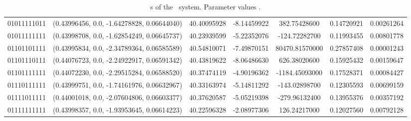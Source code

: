 \begin{table}
\begin{tabular}{c|c|c|c|c|c|c}
 	01011111011 & (0.43996456,   0.0, -1.64278828, 0.06644040) & 40.40095928 & -8.14459922 & 382.75428600 &0.14720921 &0.00261264 \\
 	01011111111 & (0.43998708,   0.0, -1.62854249, 0.06645737) & 40.23939599 & -5.22352076 & -124.72282700 &0.11993455 &0.00801778 \\
 	01101101111 & (0.43995834,   0.0, -2.34789364, 0.06585589) & 40.54810071 & -7.49870151 & 80470.81570000 &0.27857408 &0.00001243 \\
 	01101110111 & (0.44076723,   0.0, -2.24922917, 0.06591342) & 40.43819622 & -8.06486630 & 626.38020600 &0.15925432 &0.00159647 \\
 	01101111111 & (0.44072230,   0.0, -2.29515284, 0.06588520) & 40.37474119 & -4.90196362 & -1184.45093000 &0.17528371 &0.00084427 \\
 	01110111111 & (0.43999751,   0.0, -1.74161976, 0.06632967) & 40.33163974 & -5.14811292 & -143.02898700 &0.12305593 &0.00699159 \\
 	01111011111 & (0.44001018,   0.0, -2.07604806, 0.06603377) & 40.37620587 & -5.05219398 & -279.96132400 &0.13955376 &0.00357192 \\
 	01111111111 & (0.43998357,   0.0, -1.93953645, 0.06614223) & 40.22596328 & -2.08977306 & 126.24217000 &0.12027560 &0.00792128 \\
 	\end{tabular}
	\caption{\rpo s of the \twomode\ system. Parameter values .}
	\label{t-rpo2modeupto8}
\end{table}
